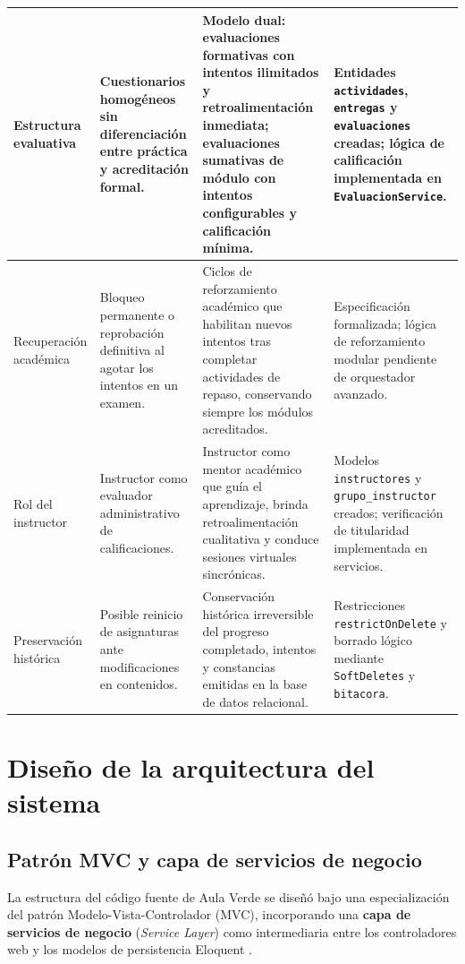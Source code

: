 \begin{table}[htbp]
\begin{tabularx}{\textwidth}{|p{2.8cm}|p{3.5cm}|X|p{2.6cm}|}
\hline
Estructura evaluativa & Cuestionarios homogéneos sin diferenciación entre práctica y acreditación formal. & Modelo dual: evaluaciones formativas con intentos ilimitados y retroalimentación inmediata; evaluaciones sumativas de módulo con intentos configurables y calificación mínima. & Entidades \texttt{actividades}, \texttt{entregas} y \texttt{evaluaciones} creadas; lógica de calificación implementada en \texttt{EvaluacionService}. \\
\hline
Recuperación académica & Bloqueo permanente o reprobación definitiva al agotar los intentos en un examen. & Ciclos de reforzamiento académico que habilitan nuevos intentos tras completar actividades de repaso, conservando siempre los módulos acreditados. & Especificación formalizada; lógica de reforzamiento modular pendiente de orquestador avanzado. \\
\hline
Rol del instructor & Instructor como evaluador administrativo de calificaciones. & Instructor como mentor académico que guía el aprendizaje, brinda retroalimentación cualitativa y conduce sesiones virtuales sincrónicas. & Modelos \texttt{instructores} y \texttt{grupo\_instructor} creados; verificación de titularidad implementada en servicios. \\
\hline
Preservación histórica & Posible reinicio de asignaturas ante modificaciones en contenidos. & Conservación histórica irreversible del progreso completado, intentos y constancias emitidas en la base de datos relacional. & Restricciones \texttt{restrictOnDelete} y borrado lógico mediante \texttt{SoftDeletes} y \texttt{bitacora}. \\
\hline
\end{tabularx}
\end{table}

\section{Diseño de la arquitectura del sistema}
\label{sec:arquitectura_sistema}

\subsection{Patrón MVC y capa de servicios de negocio}
\label{sec:mvc_servicios}

La estructura del código fuente de Aula Verde se diseñó bajo una especialización del patrón Modelo-Vista-Controlador (MVC), incorporando una \textbf{capa de servicios de negocio} (\textit{Service Layer}) como intermediaria entre los controladores web y los modelos de persistencia Eloquent \cite{fowler2002patterns}.

